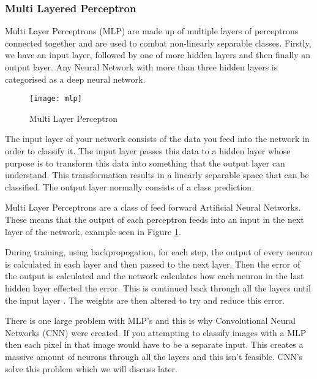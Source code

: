 \subsubsection*{Multi Layered Perceptron}
Multi Layer Perceptrons (MLP) are made up of multiple layers of perceptrons connected
together and are used to combat non-linearly separable classes.
Firstly, we have an input layer, followed by one of more hidden layers and then
finally an output layer.
Any Neural Network with more than three hidden layers is categorised as a deep neural network.

\begin{figure}[h]
    \texttt{[image: mlp]}
     \caption{Multi Layer Perceptron}
     \label{fig:mlp}
\end{figure}

The input layer of your network consists of the data you feed into the network
in order to classify it. The input layer passes this data to a hidden layer
whose purpose is to transform this data into something that the output layer can
understand. This transformation results in a linearly separable space that can be classified. The output layer normally consists of a class prediction.

Multi Layer Perceptrons are a class of feed forward Artificial Neural Networks.
These means that the output of each perceptron feeds into an input in the next
layer of the network, example seen in Figure \ref{fig:mlp}.

During training, using backpropogation, for each step, the output of every neuron is calculated in each layer and then passed to the next layer. Then the error of the output is calculated and the network calculates how each neuron in the last hidden layer effected the error. This is continued back through all the layers until the input layer \textcite{handsOnML}. The weights are then altered to try and reduce this error.

There is one large problem with MLP's and this is why Convolutional Neural
Networks (CNN) were created. If you attempting to classify images with a MLP then
each pixel in that image would have to be a separate input. This creates a
massive amount of neurons through all the layers and this isn't feasible. CNN's
solve this problem which we will discuss later.

